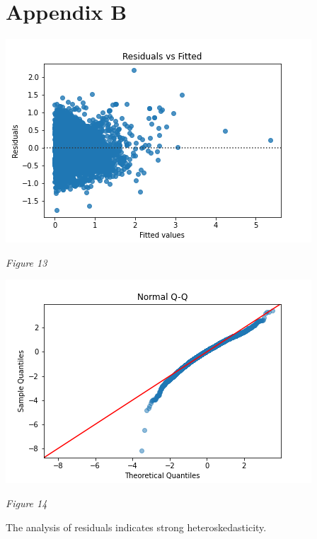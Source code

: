 \documentclass[12pt]{report}
\newenvironment{Figure}
{\par\medskip\noindent\minipage{\linewidth}}
{\endminipage\par\medskip}
\begin{document}
\section*{Appendix B}
\begin{multicols}{2}
\begin{Figure}
\centering
\includegraphics[width=\linewidth]{resid.png}
\end{Figure}
\begin{center}
\emph{Figure 13}\\
\end{center}

\begin{Figure}
\centering
\includegraphics[width=\linewidth]{normalqq.png}
\end{Figure}
\begin{center}
\emph{Figure 14}\\
\end{center}
\end{multicols}
The analysis of residuals indicates strong heteroskedasticity.
\clearpage
\end{document}
